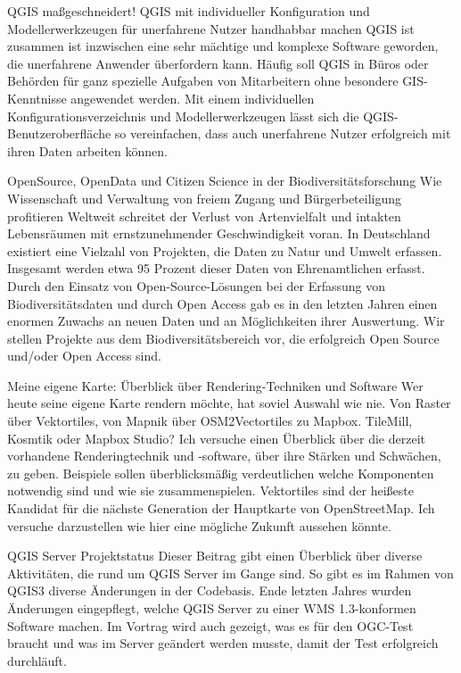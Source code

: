 %
{QGIS maßgeschneidert!}%
{QGIS mit individueller Konfiguration und Modellerwerkzeugen für unerfahrene Nutzer handhabbar machen}%
{QGIS ist zusammen ist inzwischen eine sehr mächtige und komplexe Software geworden, die unerfahrene
  Anwender überfordern kann.  Häufig soll QGIS in Büros oder Behörden für ganz spezielle Aufgaben
  von Mitarbeitern ohne besondere
GIS-Kenntnisse angewendet werden.  Mit einem individuellen Konfigurationsverzeichnis und
Modellerwerkzeugen lässt sich die QGIS-Benutzeroberfläche so vereinfachen, dass auch unerfahrene
Nutzer erfolgreich mit ihren Daten arbeiten können. 
}

%
{OpenSource, OpenData und Citizen Science in der Biodiversitätsforschung}%
{Wie Wissenschaft und Verwaltung von freiem Zugang und Bürgerbeteiligung profitieren}%
{Weltweit schreitet der Verlust von Artenvielfalt und intakten Lebensräumen mit ernstzunehmender
Geschwindigkeit voran. In Deutschland existiert eine Vielzahl von Projekten, die Daten zu Natur und
Umwelt erfassen. Insgesamt werden etwa 95 Prozent dieser Daten von Ehrenamtlichen erfasst.  Durch
den Einsatz von Open-Source-Lösungen bei der Erfassung von Biodiversitätsdaten und durch Open Access
gab es in den letzten Jahren einen enormen Zuwachs an neuen Daten und an Möglichkeiten ihrer
Auswertung. Wir stellen Projekte aus dem Biodiversitätsbereich vor, die erfolgreich Open Source
und/oder Open Access sind.}

%
{Meine eigene Karte: Überblick über Rendering-Techniken und Software}%
{}%
{Wer heute seine eigene Karte rendern möchte, hat soviel Auswahl wie nie. Von Raster über
Vektortiles, von Mapnik über OSM2Vectortiles zu Mapbox. TileMill, Kosmtik oder Mapbox Studio? Ich
versuche einen Überblick über die derzeit vorhandene Renderingtechnik und -software, über ihre
Stärken und Schwächen, zu geben. Beispiele sollen überblicksmäßig verdeutlichen welche Komponenten
notwendig sind und wie sie zusammenspielen. Vektortiles sind der heißeste Kandidat für die nächste
Generation der Hauptkarte von OpenStreetMap. Ich versuche darzustellen wie hier eine mögliche
Zukunft aussehen könnte.}


%
{QGIS Server Projektstatus}%
{}%
{Dieser Beitrag gibt einen Überblick über diverse Aktivitäten, die rund um QGIS Server im Gange sind. So gibt es im Rahmen von QGIS3 diverse Änderungen in der Codebasis. Ende letzten Jahres wurden Änderungen eingepflegt, welche QGIS Server zu einer WMS 1.3-konformen Software machen. Im Vortrag wird auch gezeigt, was es für den OGC-Test braucht und was im Server geändert werden musste, damit der Test erfolgreich durchläuft.}

